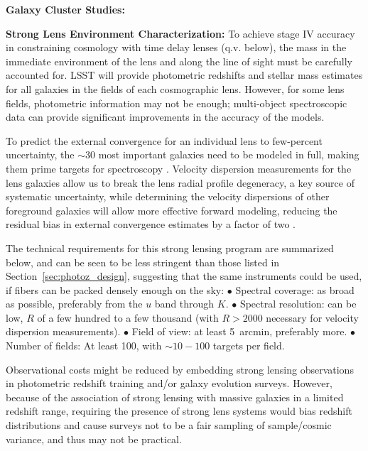 {\bf Galaxy Cluster Studies:}


{\bf Strong Lens Environment Characterization:}
To achieve stage IV accuracy in constraining cosmology with time delay lenses (q.v. below), the
mass in the immediate environment of the lens and along the line of
sight must be carefully accounted for. LSST will provide photometric
redshifts and stellar mass estimates for all galaxies in the fields of each
cosmographic lens.  
However, for some lens fields,
photometric information may not be enough; multi-object spectroscopic
data can provide significant improvements in the accuracy of the models.

To predict the external convergence for an individual lens to few-percent uncertainty, the $\sim 30$ most important galaxies need to be modeled in full, making
them prime targets for spectroscopy \citep{McCullyEtal2016}.  Velocity
dispersion measurements for the lens galaxies allow us to break the lens radial profile degeneracy, a 
key source of systematic uncertainty, while determining the velocity
dispersions of other foreground galaxies will allow more
effective forward modeling, reducing the residual bias in
external convergence estimates by a factor of two
\citep{CollettEtal2013}.  


The technical requirements for this strong lensing program are
summarized below, and can be seen to be less stringent than those listed
in Section~\ref{sec:photoz_design}, suggesting that the same instruments could be used, if fibers can be packed densely enough on the sky:  
$\bullet$ Spectral coverage: as broad as possible, preferably from the $u$ band
through $K$.
$\bullet$ Spectral resolution: can be low, $R$ of a few hundred to a few
thousand (with $R>2000$ necessary for velocity dispersion measurements).
$\bullet$ Field of view: at least 5~arcmin, preferably more.
$\bullet$ Number of fields: At least 100, with $\sim10-100$ targets per field.

Observational costs might be reduced by embedding strong lensing observations in photometric redshift training and/or galaxy evolution surveys.  However, because of the association of strong lensing with massive galaxies in a limited redshift range, requiring the presence of strong lens systems would bias redshift distributions and cause surveys not to be a fair sampling of sample/cosmic variance, and thus may not be practical.

